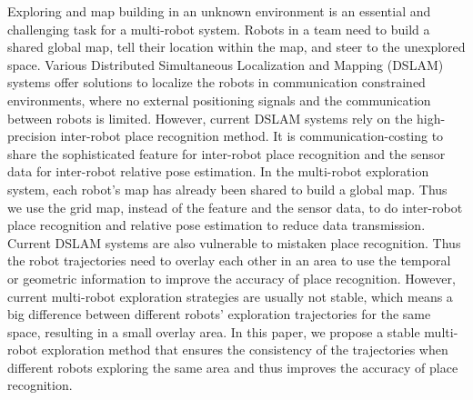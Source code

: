 Exploring and map building in an unknown environment is an essential and challenging task for a multi-robot system. 
Robots in a team need to build a shared global map, tell their location within the map, and steer to the unexplored space.
Various Distributed Simultaneous Localization and Mapping (DSLAM) systems offer solutions to localize the robots in communication constrained environments, where no external positioning signals and the communication between robots is limited.
However, current DSLAM systems rely on the high-precision inter-robot place recognition method. It is communication-costing to share the sophisticated feature for inter-robot place recognition and the sensor data for inter-robot relative pose estimation.
In the multi-robot exploration system, each robot's map has already been shared to build a global map.
Thus we use the grid map, instead of the feature and the sensor data, to do inter-robot place recognition and relative pose estimation to reduce data transmission.
Current DSLAM systems are also vulnerable to mistaken place recognition. Thus the robot trajectories need to overlay each other in an area to use the temporal or geometric information to improve the accuracy of place recognition.
However, current multi-robot exploration strategies are usually not stable, which means a big difference between different robots' exploration trajectories for the same space, resulting in a small overlay area.
In this paper, we propose a stable multi-robot exploration method that ensures the consistency of the trajectories when different robots exploring the same area and thus improves the accuracy of place recognition.